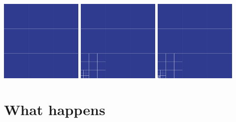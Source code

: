 \begin{center}
  \includegraphics[width=0.3\textwidth]{11_basics/grid00.png}
  \includegraphics[width=0.3\textwidth]{11_basics/grid01.png}
  \includegraphics[width=0.3\textwidth]{11_basics/grid02.png}
\end{center}


\section{What happens}


